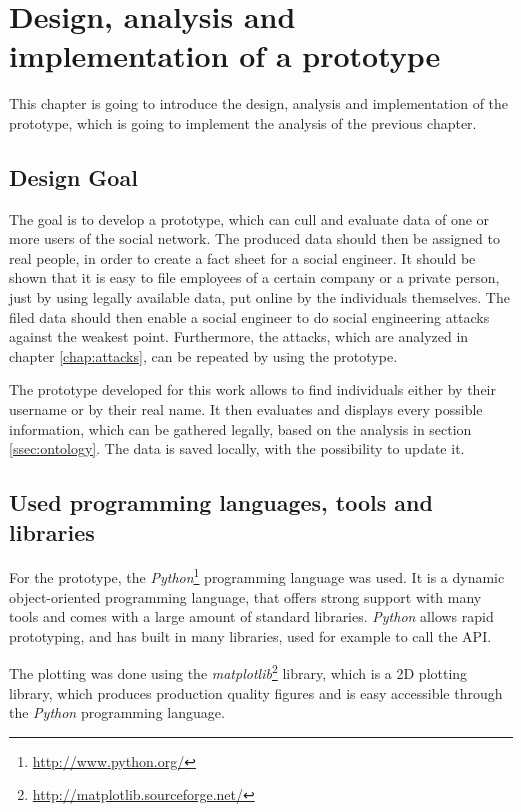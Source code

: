 \chapter{Design, analysis and implementation of a prototype}
\label{chap:prototype}

This chapter is going to introduce the design, analysis and implementation of
the prototype, which is going to implement the analysis of the previous
chapter.

\section{Design Goal}

The goal is to develop a prototype, which can cull and evaluate data of one or
more users of the \Twitter{} social network. The produced data should then be
assigned to real people, in order to create a fact sheet for a social engineer.
It should be shown that it is easy to file employees of a certain company or a
private person, just by using legally available data, put online by the
individuals themselves. The filed data should then enable a social engineer to
do social engineering attacks against the weakest point. Furthermore, the
attacks, which are analyzed in chapter \ref{chap:attacks}, can be repeated by
using the prototype.

The prototype developed for this work allows to find individuals either by
their username or by their real name. It then evaluates and displays every
possible information, which can be gathered legally, based on the analysis in
section \ref{ssec:ontology}. The data is saved locally, with the possibility to
update it.

\section{Used programming languages, tools and libraries}

For the prototype, the \textit{Python}\footnote{\url{http://www.python.org/}}
programming language was used. It is a dynamic object-oriented programming
language, that offers strong support with many tools and comes with a large
amount of standard libraries. \textit{Python} allows rapid prototyping, and has
built in many libraries, used for example to call the \Twitter{} API.

The plotting was done using the
\textit{matplotlib}\footnote{\url{http://matplotlib.sourceforge.net/}} library,
which is a 2D plotting library, which produces production quality figures and
is easy accessible through the \textit{Python} programming language.

